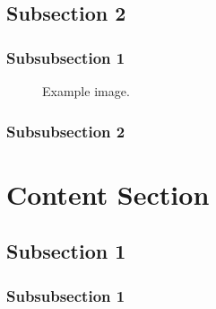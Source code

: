 \documentclass[12pt]{article}
\begin{document}
\iffalse
\subsection{Subsection 2} %

\lipsum[2] %


\subsubsection{Subsubsection 1} %

\lipsum[3] %

\begin{figure}[H] %
\caption{Example image.}
\label{fig:speciation}
\end{figure}


\subsubsection{Subsubsection 2} %

\lipsum[4] %


\section{Content Section} %

\lipsum[5] %


\subsection{Subsection 1} %

\subsubsection{Subsubsection 1} %

\lipsum[6] %

\end{document}
